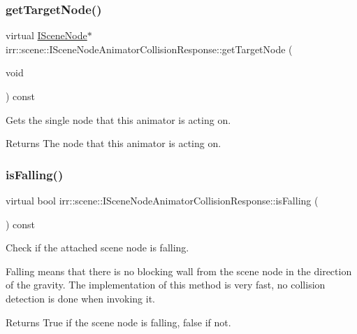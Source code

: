 \subsubsection{\texorpdfstring{get\+Target\+Node()}{getTargetNode()}\hspace{0.1cm}{\footnotesize\ttfamily [2/2]}}
{\footnotesize\ttfamily virtual \hyperlink{classirr_1_1scene_1_1ISceneNode}{I\+Scene\+Node}$\ast$ irr\+::scene\+::\+I\+Scene\+Node\+Animator\+Collision\+Response\+::get\+Target\+Node (\begin{DoxyParamCaption}\item[{void}]{ }\end{DoxyParamCaption}) const\hspace{0.3cm}{\ttfamily [pure virtual]}}



Gets the single node that this animator is acting on. 

\begin{DoxyReturn}{Returns}
The node that this animator is acting on. 
\end{DoxyReturn}
\mbox{\label{classirr_1_1scene_1_1ISceneNodeAnimatorCollisionResponse_a66f5534c1d2ac0e2ea52e7b21a3c91d7}} 
\subsubsection{\texorpdfstring{is\+Falling()}{isFalling()}\hspace{0.1cm}{\footnotesize\ttfamily [1/2]}}
{\footnotesize\ttfamily virtual bool irr\+::scene\+::\+I\+Scene\+Node\+Animator\+Collision\+Response\+::is\+Falling (\begin{DoxyParamCaption}{ }\end{DoxyParamCaption}) const\hspace{0.3cm}{\ttfamily [pure virtual]}}



Check if the attached scene node is falling. 

Falling means that there is no blocking wall from the scene node in the direction of the gravity. The implementation of this method is very fast, no collision detection is done when invoking it. \begin{DoxyReturn}{Returns}
True if the scene node is falling, false if not. 
\end{DoxyReturn}
\mbox{\label{classirr_1_1scene_1_1ISceneNodeAnimatorCollisionResponse_a66f5534c1d2ac0e2ea52e7b21a3c91d7}} 
